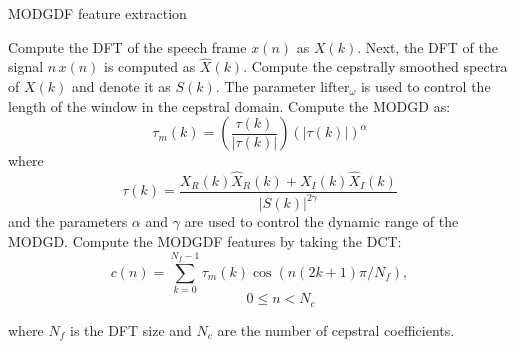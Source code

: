 \documentclass[preprint,12pt,5p]{elsarticle}
\begin{document}
\begin{algorithm}[!th]
\caption{MODGDF feature extraction}
\label{algo:modgd}
\begin{algorithmic}[1]

\STATE {}
\STATE Compute the DFT of the speech frame $x(n)$ as $X(k)$.
\STATE Next, the DFT of the signal $n\,x(n)$ is computed as $\hat{X}(k)$.
\STATE Compute the cepstrally smoothed spectra of $X(k)$ and denote it as
$S(k)$. The parameter $\textrm{lifter}_\omega$ is used to control the length of
the window in the cepstral domain. 
\STATE Compute the MODGD as:
\begin{equation*}
\tau_m(k) = \left(\frac{\tau(k)}{|\tau(k)|}\right) (|\tau(k)|)^\alpha
\end{equation*}
where
\begin{equation*}
\tau(k) = \frac{X_R(k)\hat{X}_R(k)+X_I(k)\hat{X}_I(k)}{|S(k)|^{2\gamma}}
\end{equation*}
and the parameters $\alpha$ and $\gamma$ are used to control the dynamic range
of the MODGD. 
\STATE Compute the MODGDF features by taking the DCT:
\begin{equation*}
c(n) = \sum_{k=0}^{N_f-1}\tau_m(k)\cos(n(2k+1)\pi/N_f), 
\end{equation*}
\vspace{-5mm}
\begin{equation*}
\quad \quad \quad 0 \leq n < N_c
\end{equation*}

where $N_f$ is the DFT size and $N_c$ are the number of cepstral coefficients. 

\end{algorithmic}
\end{algorithm}

\begin{table*}[h!tb]
\centering
\caption{NIST 2010 conditions used in the evaluation}
\label{tab:datasetConditions}
\end{table*}
\end{document}
